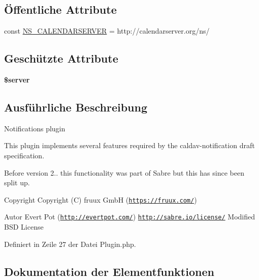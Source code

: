 \subsection*{Öffentliche Attribute}
\begin{DoxyCompactItemize}
\item 
const \mbox{\hyperlink{class_sabre_1_1_cal_d_a_v_1_1_notifications_1_1_plugin_a530c8d1a280038f15171a25a29d0883e}{N\+S\+\_\+\+C\+A\+L\+E\+N\+D\+A\+R\+S\+E\+R\+V\+ER}} = \textquotesingle{}http\+://calendarserver.\+org/ns/\textquotesingle{}
\end{DoxyCompactItemize}
\subsection*{Geschützte Attribute}
\begin{DoxyCompactItemize}
\item 
\mbox{\label{class_sabre_1_1_cal_d_a_v_1_1_notifications_1_1_plugin_a37ddb1519380d120fee4e924c0181262}} 
{\bfseries \$server}
\end{DoxyCompactItemize}


\subsection{Ausführliche Beschreibung}
Notifications plugin

This plugin implements several features required by the caldav-\/notification draft specification.

Before version 2.. this functionality was part of Sabre but this has since been split up.

\begin{DoxyCopyright}{Copyright}
Copyright (C) fruux GmbH (\href{https://fruux.com/}{\tt https\+://fruux.\+com/}) 
\end{DoxyCopyright}
\begin{DoxyAuthor}{Autor}
Evert Pot (\href{http://evertpot.com/}{\tt http\+://evertpot.\+com/})  \href{http://sabre.io/license/}{\tt http\+://sabre.\+io/license/} Modified B\+SD License 
\end{DoxyAuthor}


Definiert in Zeile 27 der Datei Plugin.\+php.



\subsection{Dokumentation der Elementfunktionen}
\mbox{\label{class_sabre_1_1_cal_d_a_v_1_1_notifications_1_1_plugin_ae4ae94078bdf6b64250e05cdb6a8aed4}} 
